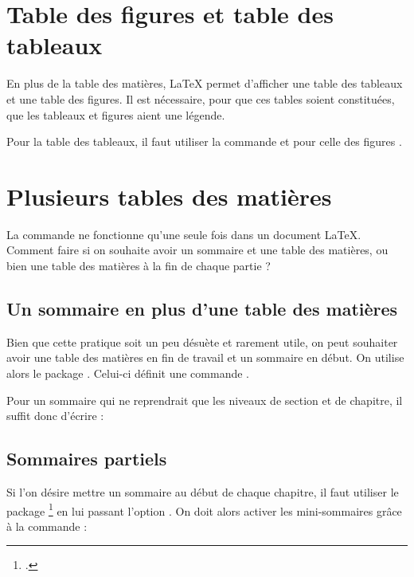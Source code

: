\section{Table des figures et table des tableaux}\label{tablefigure}

En plus de la table des matières, \LaTeX{} permet d'afficher une table des tableaux et une table des figures. Il est nécessaire, pour que ces tables soient constituées, que les tableaux et figures aient une légende.

Pour la table des tableaux, il faut utiliser la commande  et pour celle des figures  .



\section{Plusieurs tables des matières}

La commande  ne fonctionne qu'une seule fois dans un document \LaTeX{}. Comment faire si on souhaite avoir un sommaire et une table des matières, ou bien une table des matières à la fin de chaque  partie ?

\subsection{Un sommaire en plus d'une table des matières}

Bien que cette pratique soit un peu désuète et rarement utile, on peut souhaiter  avoir une table des matières en fin de travail et un sommaire en début.
On utilise alors le package . Celui-ci définit une commande 
.

Pour un sommaire qui ne reprendrait que les niveaux de section et de chapitre, il suffit donc d'écrire :

\begin{latexcode}
\end{latexcode}




\subsection{Sommaires partiels}

Si l'on désire mettre un sommaire au début de chaque chapitre, il faut utiliser le package \footcite{minitoc} en lui passant l'option . On doit alors activer les mini-sommaires grâce à la commande  :

